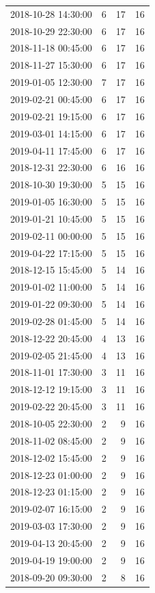 \begin{tabular}{lrrr}
2018-10-28 14:30:00 & 6 & 17 & 16 \\
2018-10-29 22:30:00 & 6 & 17 & 16 \\
2018-11-18 00:45:00 & 6 & 17 & 16 \\
2018-11-27 15:30:00 & 6 & 17 & 16 \\
2019-01-05 12:30:00 & 7 & 17 & 16 \\
2019-02-21 00:45:00 & 6 & 17 & 16 \\
2019-02-21 19:15:00 & 6 & 17 & 16 \\
2019-03-01 14:15:00 & 6 & 17 & 16 \\
2019-04-11 17:45:00 & 6 & 17 & 16 \\
2018-12-31 22:30:00 & 6 & 16 & 16 \\
2018-10-30 19:30:00 & 5 & 15 & 16 \\
2019-01-05 16:30:00 & 5 & 15 & 16 \\
2019-01-21 10:45:00 & 5 & 15 & 16 \\
2019-02-11 00:00:00 & 5 & 15 & 16 \\
2019-04-22 17:15:00 & 5 & 15 & 16 \\
2018-12-15 15:45:00 & 5 & 14 & 16 \\
2019-01-02 11:00:00 & 5 & 14 & 16 \\
2019-01-22 09:30:00 & 5 & 14 & 16 \\
2019-02-28 01:45:00 & 5 & 14 & 16 \\
2018-12-22 20:45:00 & 4 & 13 & 16 \\
2019-02-05 21:45:00 & 4 & 13 & 16 \\
2018-11-01 17:30:00 & 3 & 11 & 16 \\
2018-12-12 19:15:00 & 3 & 11 & 16 \\
2019-02-22 20:45:00 & 3 & 11 & 16 \\
2018-10-05 22:30:00 & 2 & 9 & 16 \\
2018-11-02 08:45:00 & 2 & 9 & 16 \\
2018-12-02 15:45:00 & 2 & 9 & 16 \\
2018-12-23 01:00:00 & 2 & 9 & 16 \\
2018-12-23 01:15:00 & 2 & 9 & 16 \\
2019-02-07 16:15:00 & 2 & 9 & 16 \\
2019-03-03 17:30:00 & 2 & 9 & 16 \\
2019-04-13 20:45:00 & 2 & 9 & 16 \\
2019-04-19 19:00:00 & 2 & 9 & 16 \\
2018-09-20 09:30:00 & 2 & 8 & 16 \\

\end{tabular}

